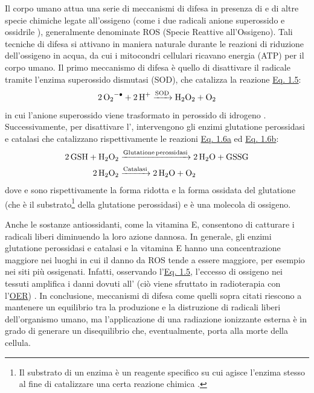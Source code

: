 \documentclass[12pt,a4paper,twoside]{report}
\begin{document}
	Il corpo umano attua una serie di meccanismi di difesa in presenza di  e di altre specie chimiche legate all'ossigeno (come i due radicali anione superossido  e ossidrile ), generalmente denominate ROS (Specie Reattive all'Ossigeno). Tali tecniche di difesa si attivano in maniera naturale durante le reazioni di riduzione dell'ossigeno in acqua, da cui i mitocondri cellulari ricavano energia (ATP) per il corpo umano. Il primo meccanismo di difesa è quello di disattivare il radicale  tramite l'enzima superossido dismutasi (SOD), che catalizza la reazione \hyperref[eq:sod]{Eq. 1.5}:
	\begin{equation}
		\ce{2O2^{-.} + 2H^+ ->[SOD] H2O2 + O2}
		\label{eq:sod}
	\end{equation}
	in cui l'anione superossido  viene trasformato in perossido di idrogeno . Successivamente, per disattivare l', intervengono gli enzimi glutatione perossidasi e catalasi che catalizzano rispettivamente le reazioni \hyperref[eq:gsh]{Eq. 1.6a} ed \hyperref[eq:catalasi]{Eq. 1.6b}:
	\begin{subequations}
		\begin{align}
			\label{eq:gsh}
			\ce{2GSH + H2O2 &->[Glutatione perossidasi] 2H2O + GSSG}\\
			\label{eq:catalasi}
			\ce{2H2O2 &->[Catalasi] 2H2O + O2}
		\end{align}
	\end{subequations}
	dove  e  sono rispettivamente la forma ridotta e la forma ossidata del glutatione (che è il substrato\footnote{Il substrato di un enzima è un reagente specifico su cui agisce l'enzima stesso al fine di catalizzare una certa reazione chimica \cite{campbell2anno}.} della glutatione perossidasi) e  è una molecola di ossigeno.
	
	Anche le sostanze antiossidanti, come la vitamina E, consentono di catturare i radicali liberi diminuendo la loro azione dannosa. In generale, gli enzimi glutatione perossidasi e catalasi e la vitamina E hanno una concentrazione maggiore nei luoghi in cui il danno da ROS tende a essere maggiore, per esempio nei siti più ossigenati. Infatti, osservando l'\hyperref[eq:sod]{Eq. 1.5}, l'eccesso di ossigeno nei tessuti amplifica i danni dovuti all' (ciò viene sfruttato in radioterapia con l'\hyperref[par:oer]{OER}) \cite{ros,Leuzzi2013-ga}. In conclusione, meccanismi di difesa come quelli sopra citati riescono a mantenere un equilibrio tra la produzione e la distruzione di radicali liberi dell'organismo umano, ma l'applicazione di una radiazione ionizzante esterna è in grado di generare un disequilibrio che, eventualmente, porta alla morte della cellula.
	
\end{document}
